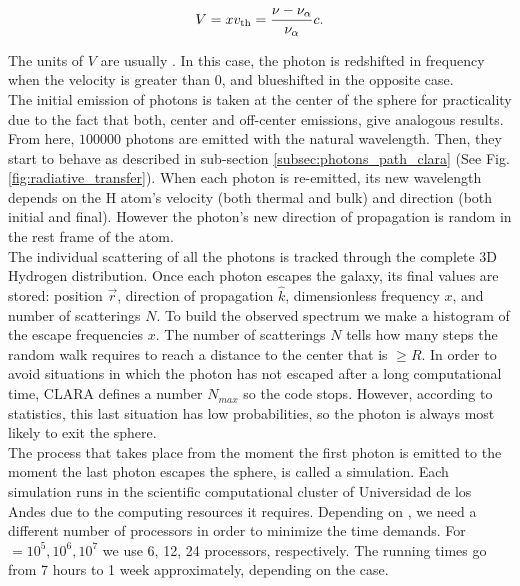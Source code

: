 \documentclass[twocolappendix]{latex/emulateapj}
\begin{document}
\begin{equation}
	\label{eq:V}
	V = xv_{\rm th} = \frac{\nu -\nu_{\rm \alpha}}{\nu_{\rm \alpha}}c.
\end{equation}

The units of $V$ are usually \kms. In this case, the photon is redshifted in frequency when the velocity is greater than 0, and blueshifted in the opposite case. \\

The initial emission of photons is taken at the center of the sphere for practicality due to the fact that both, center and off-center emissions, give analogous results. From here, $100000$ photons are emitted with the natural \lya wavelength. Then, they start to behave as described in sub-section \ref{subsec:photons_path_clara} (See Fig. \ref{fig:radiative_transfer}). When each photon is re-emitted, its new wavelength depends on the H atom's velocity (both thermal and bulk) and direction (both initial and final). However the photon's new direction of propagation is random in the rest frame of the atom. \\ 

The individual scattering of all the photons is tracked through the complete 3D Hydrogen distribution. Once each photon escapes the galaxy, its final values are stored: position $\vec{r}$, direction of propagation $\hat{k}$, dimensionless frequency $x$, and number of scatterings $N$. To build the observed spectrum we make a histogram of the escape frequencies $x$. The number of scatterings $N$ tells how many steps the random walk requires to reach a distance to the center that is $\geq R$. In order to avoid situations in which the photon has not escaped after a long computational time, CLARA defines a number $N_{max}$ so the code stops. However, according to statistics, this last situation has low probabilities, so the photon is always most likely to exit the sphere. \\

The process that takes place from the moment the first photon is emitted to the moment the last photon escapes the sphere, is called a simulation. Each simulation runs in the scientific computational cluster of Universidad de los Andes due to the computing resources it requires. Depending on \tauh, we need a different number of processors in order to minimize the time demands. For \tauh $=10^5, 10^6, 10^7$ we use 6, 12, 24 processors, respectively. The running times go from 7 hours to 1 week approximately, depending on the case. \\
\end{document}
